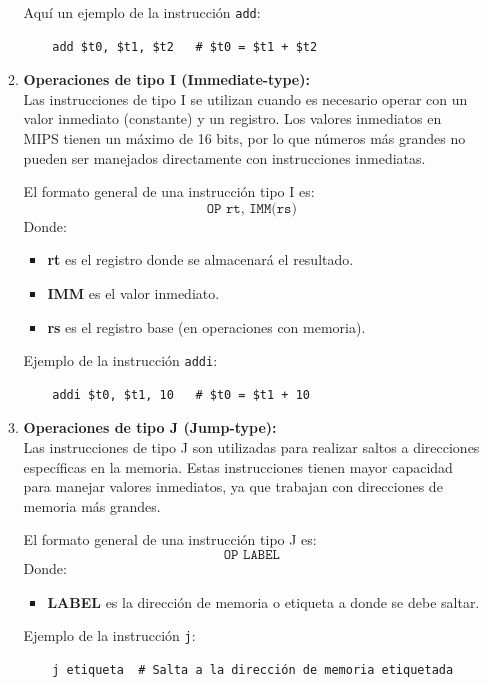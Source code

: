 \documentclass[12pt,letterpaper]{article}
\begin{document}
\begin{enumerate}
\begin{enumerate}[label=\arabic*)]
    Aquí un ejemplo de la instrucción \texttt{add}:
    \begin{verbatim}
    add $t0, $t1, $t2   # $t0 = $t1 + $t2
    \end{verbatim}

  \item \textbf{Operaciones de tipo I (Immediate-type):}\\
    Las instrucciones de tipo I se utilizan cuando es necesario operar con un valor inmediato (constante) y un registro. Los valores inmediatos en MIPS tienen un máximo de 16 bits, por lo que números más grandes no pueden ser manejados directamente con instrucciones inmediatas.
    
    El formato general de una instrucción tipo I es:
    \[
    \texttt{OP \ rt, IMM(rs)}
    \]
    Donde:
    \begin{itemize}
    \item \textbf{rt} es el registro donde se almacenará el resultado.
    \item \textbf{IMM} es el valor inmediato.
    \item \textbf{rs} es el registro base (en operaciones con memoria).
    \end{itemize}
    
    Ejemplo de la instrucción \texttt{addi}:
    \begin{verbatim}
    addi $t0, $t1, 10   # $t0 = $t1 + 10
    \end{verbatim}

  \item \textbf{Operaciones de tipo J (Jump-type):}\\
    Las instrucciones de tipo J son utilizadas para realizar saltos a direcciones específicas en la memoria. Estas instrucciones tienen mayor capacidad para manejar valores inmediatos, ya que trabajan con direcciones de memoria más grandes.
    
    El formato general de una instrucción tipo J es:
    \[
    \texttt{OP \ LABEL}
    \]
    Donde:
    \begin{itemize}
    \item \textbf{LABEL} es la dirección de memoria o etiqueta a donde se debe saltar.
    \end{itemize}

    Ejemplo de la instrucción \texttt{j}:
    \begin{verbatim}
    j etiqueta  # Salta a la dirección de memoria etiquetada
    \end{verbatim}
  \end{enumerate}
  \bigskip
  
\end{enumerate}
\end{document}
